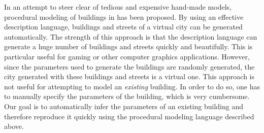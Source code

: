 \documentclass[12pt,letterpaper]{article}
\begin{document}
In an attempt to steer clear of tedious and expensive hand-made models,
procedural modeling of buildings in \cite{PMB_MWH,PMB_WWS,PMB_PM} has been proposed.
By using an effective description language, buildings and streets of a virtual
city can be generated automatically.
The strength of this approach is that the description language can generate
a huge number of buildings and streets quickly and beautifully.
This is particular useful for gaming or other computer graphics applications.
However, since the parameters used to generate the buildings are randomly
generated, the city generated with these buildings and streets is a virtual one.
This approach is not useful for attempting to model an {\it existing} building.
In order to do so, one has to manually specify the parameters of the building,
which is very cumbersome.
Our goal is to automatically infer the parameters of an existing building and
therefore reproduce it quickly using the procedural modeling language
described above.
\end{document}
